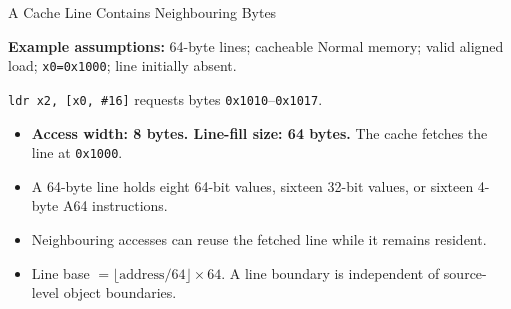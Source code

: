 \documentclass[aspectratio=169,11pt,t]{beamer}
\newcommand{\key}[1]{\textbf{#1}}
\newcommand{\hex}[1]{\texttt{0x#1}}
\newcommand{\code}[1]{\texttt{#1}}
\newcommand{\Model}[1]{\par{\scriptsize\color{deepblue}\textbf{Example assumptions:} #1\par}\vspace{.14cm}}
\newcommand{\EightWords}[1]{%
  \foreach \i in {0,...,7} {
    \pgfmathtruncatemacro{\off}{8*\i}
    \node[memcell,fill=#1] (word\i) at ({1.26*\i},0) {\off-\the\numexpr\off+7\relax};
  }
}
\begin{document}
\begin{frame}{A Cache Line Contains Neighbouring Bytes}
\small
\Model{64-byte lines; cacheable Normal memory; valid aligned load; \code{x0=0x1000}; line initially absent.}
\code{ldr x2, [x0, \#16]} requests bytes \hex{1010}--\hex{1017}.
\begin{center}
\end{center}
\begin{itemize}\setlength{\itemsep}{4pt}
  \item \key{Access width: 8 bytes. Line-fill size: 64 bytes.} The cache fetches the line at \hex{1000}.
  \item A 64-byte line holds eight 64-bit values, sixteen 32-bit values, or sixteen 4-byte A64 instructions.
  \item Neighbouring accesses can reuse the fetched line while it remains resident.
  \item Line base \(=\lfloor\text{address}/64\rfloor\times64\). A line boundary is independent of source-level object boundaries.
\end{itemize}
\end{frame}
\end{document}
